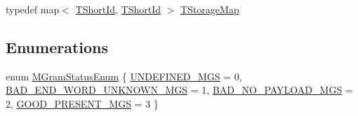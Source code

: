 \begin{DoxyCompactItemize}
\item 
typedef map$<$ \hyperlink{namespaceuva_1_1smt_1_1bpbd_1_1server_1_1lm_1_1identifiers_a33043a191e9a637dea742a89d23c8bdc}{T\+Short\+Id}, \hyperlink{namespaceuva_1_1smt_1_1bpbd_1_1server_1_1lm_1_1identifiers_a33043a191e9a637dea742a89d23c8bdc}{T\+Short\+Id} $>$ \hyperlink{namespaceuva_1_1smt_1_1bpbd_1_1server_1_1lm_a848930f30620014225832ed8d3e6a93e}{T\+Storage\+Map}
\end{DoxyCompactItemize}
\subsection*{Enumerations}
\begin{DoxyCompactItemize}
\item 
enum \hyperlink{namespaceuva_1_1smt_1_1bpbd_1_1server_1_1lm_ab9b3e7382b561dcb8abcd6b55e9b796a}{M\+Gram\+Status\+Enum} \{ \hyperlink{namespaceuva_1_1smt_1_1bpbd_1_1server_1_1lm_ab9b3e7382b561dcb8abcd6b55e9b796aa9019f6deb96568ca044e6c1849e446cb}{U\+N\+D\+E\+F\+I\+N\+E\+D\+\_\+\+M\+G\+S} = 0, 
\hyperlink{namespaceuva_1_1smt_1_1bpbd_1_1server_1_1lm_ab9b3e7382b561dcb8abcd6b55e9b796aab88dace63609938caf3106666433cd1c}{B\+A\+D\+\_\+\+E\+N\+D\+\_\+\+W\+O\+R\+D\+\_\+\+U\+N\+K\+N\+O\+W\+N\+\_\+\+M\+G\+S} = 1, 
\hyperlink{namespaceuva_1_1smt_1_1bpbd_1_1server_1_1lm_ab9b3e7382b561dcb8abcd6b55e9b796aaf10f109b34b87eedfb0ec95d81bfa931}{B\+A\+D\+\_\+\+N\+O\+\_\+\+P\+A\+Y\+L\+O\+A\+D\+\_\+\+M\+G\+S} = 2, 
\hyperlink{namespaceuva_1_1smt_1_1bpbd_1_1server_1_1lm_ab9b3e7382b561dcb8abcd6b55e9b796aa4682346ec5c105689f1d0bc41af318a9}{G\+O\+O\+D\+\_\+\+P\+R\+E\+S\+E\+N\+T\+\_\+\+M\+G\+S} = 3
 \}
\end{DoxyCompactItemize}
